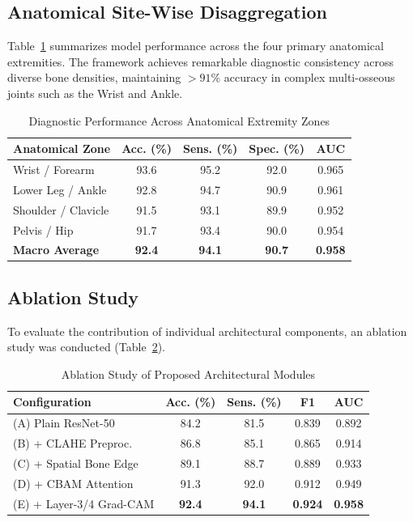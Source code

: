 \documentclass[3p,twocolumn]{elsarticle}
\begin{document}
\subsection{Anatomical Site-Wise Disaggregation}
Table~\ref{tab:anatomy} summarizes model performance across the four primary anatomical extremities. The framework achieves remarkable diagnostic consistency across diverse bone densities, maintaining $>91\%$ accuracy in complex multi-osseous joints such as the Wrist and Ankle.

\begin{table}[!ht]
\centering
\footnotesize
\setlength{\tabcolsep}{2.5pt}
\renewcommand{\arraystretch}{1.15}
\caption{Diagnostic Performance Across Anatomical Extremity Zones}
\label{tab:anatomy}
\begin{tabular*}{\columnwidth}{@{\extracolsep{\fill}}lcccc@{}}
\toprule
\textbf{Anatomical Zone} & \textbf{Acc. (\%)} & \textbf{Sens. (\%)} & \textbf{Spec. (\%)} & \textbf{AUC} \\
\midrule
Wrist / Forearm & 93.6 & 95.2 & 92.0 & 0.965 \\
Lower Leg / Ankle & 92.8 & 94.7 & 90.9 & 0.961 \\
Shoulder / Clavicle & 91.5 & 93.1 & 89.9 & 0.952 \\
Pelvis / Hip & 91.7 & 93.4 & 90.0 & 0.954 \\
\midrule
\textbf{Macro Average} & \textbf{92.4} & \textbf{94.1} & \textbf{90.7} & \textbf{0.958} \\
\bottomrule
\end{tabular*}
\end{table}

\subsection{Ablation Study}
To evaluate the contribution of individual architectural components, an ablation study was conducted (Table~\ref{tab:ablation}).

\begin{table}[!ht]
\centering
\footnotesize
\setlength{\tabcolsep}{2.5pt}
\renewcommand{\arraystretch}{1.15}
\caption{Ablation Study of Proposed Architectural Modules}
\label{tab:ablation}
\begin{tabular*}{\columnwidth}{@{\extracolsep{\fill}}lcccc@{}}
\toprule
\textbf{Configuration} & \textbf{Acc. (\%)} & \textbf{Sens. (\%)} & \textbf{F1} & \textbf{AUC} \\
\midrule
(A) Plain ResNet-50 & 84.2 & 81.5 & 0.839 & 0.892 \\
(B) + CLAHE Preproc. & 86.8 & 85.1 & 0.865 & 0.914 \\
(C) + Spatial Bone Edge & 89.1 & 88.7 & 0.889 & 0.933 \\
(D) + CBAM Attention & 91.3 & 92.0 & 0.912 & 0.949 \\
(E) + Layer-3/4 Grad-CAM & \textbf{92.4} & \textbf{94.1} & \textbf{0.924} & \textbf{0.958} \\
\bottomrule
\end{tabular*}
\end{table}
\end{document}
